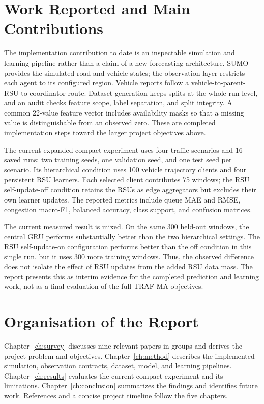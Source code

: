 \section{Work Reported and Main Contributions}
The implementation contribution to date is an inspectable simulation and learning pipeline rather than a claim of a new forecasting architecture. SUMO provides the simulated road and vehicle states; the observation layer restricts each agent to its configured region. Vehicle reports follow a vehicle-to-parent-RSU-to-coordinator route. Dataset generation keeps splits at the whole-run level, and an audit checks feature scope, label separation, and split integrity. A common 22-value feature vector includes availability masks so that a missing value is distinguishable from an observed zero. These are completed implementation steps toward the larger project objectives above.

The current expanded compact experiment uses four traffic scenarios and 16 saved runs: two training seeds, one validation seed, and one test seed per scenario. Its hierarchical condition uses 100 vehicle trajectory clients and four persistent RSU learners. Each selected client contributes 75 windows; the RSU self-update-off condition retains the RSUs as edge aggregators but excludes their own learner updates. The reported metrics include queue MAE and RMSE, congestion macro-F1, balanced accuracy, class support, and confusion matrices.

The current measured result is mixed. On the same 300 held-out windows, the central GRU performs substantially better than the two hierarchical settings. The RSU self-update-on configuration performs better than the off condition in this single run, but it uses 300 more training windows. Thus, the observed difference does not isolate the effect of RSU updates from the added RSU data mass. The report presents this as interim evidence for the completed prediction and learning work, not as a final evaluation of the full TRAF-MA objectives.

\section{Organisation of the Report}
Chapter~\ref{ch:survey} discusses nine relevant papers in groups and derives the project problem and objectives. Chapter~\ref{ch:method} describes the implemented simulation, observation contracts, dataset, model, and learning pipelines. Chapter~\ref{ch:results} evaluates the current compact experiment and its limitations. Chapter~\ref{ch:conclusion} summarizes the findings and identifies future work. References and a concise project timeline follow the five chapters.
